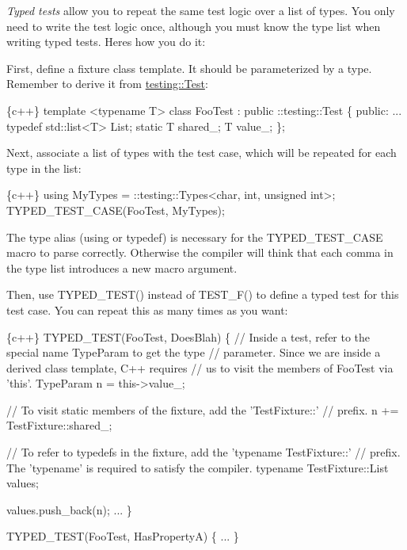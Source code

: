 {\itshape Typed tests} allow you to repeat the same test logic over a list of types. You only need to write the test logic once, although you must know the type list when writing typed tests. Here\textquotesingle{}s how you do it\+:

First, define a fixture class template. It should be parameterized by a type. Remember to derive it from {\ttfamily \hyperlink{classtesting_1_1Test}{testing\+::\+Test}}\+:


\begin{DoxyCode}
\{c++\}
template <typename T>
class FooTest : public ::testing::Test \{
 public:
  ...
  typedef std::list<T> List;
  static T shared\_;
  T value\_;
\};
\end{DoxyCode}


Next, associate a list of types with the test case, which will be repeated for each type in the list\+:


\begin{DoxyCode}
\{c++\}
using MyTypes = ::testing::Types<char, int, unsigned int>;
TYPED\_TEST\_CASE(FooTest, MyTypes);
\end{DoxyCode}


The type alias ({\ttfamily using} or {\ttfamily typedef}) is necessary for the {\ttfamily T\+Y\+P\+E\+D\+\_\+\+T\+E\+S\+T\+\_\+\+C\+A\+SE} macro to parse correctly. Otherwise the compiler will think that each comma in the type list introduces a new macro argument.

Then, use {\ttfamily T\+Y\+P\+E\+D\+\_\+\+T\+E\+S\+T()} instead of {\ttfamily T\+E\+S\+T\+\_\+\+F()} to define a typed test for this test case. You can repeat this as many times as you want\+:


\begin{DoxyCode}
\{c++\}
TYPED\_TEST(FooTest, DoesBlah) \{
  // Inside a test, refer to the special name TypeParam to get the type
  // parameter.  Since we are inside a derived class template, C++ requires
  // us to visit the members of FooTest via 'this'.
  TypeParam n = this->value\_;

  // To visit static members of the fixture, add the 'TestFixture::'
  // prefix.
  n += TestFixture::shared\_;

  // To refer to typedefs in the fixture, add the 'typename TestFixture::'
  // prefix.  The 'typename' is required to satisfy the compiler.
  typename TestFixture::List values;

  values.push\_back(n);
  ...
\}

TYPED\_TEST(FooTest, HasPropertyA) \{ ... \}
\end{DoxyCode}


